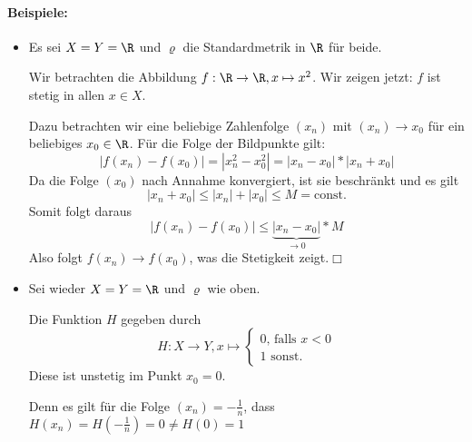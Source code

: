 \paragraph{Beispiele:}
\begin{itemize}
	\item Es sei $X=Y=\R$ und $\varrho$ die Standardmetrik in $\R$ für beide.

	Wir betrachten die Abbildung $f:\R\rightarrow\R,x\mapsto x^2$. Wir zeigen jetzt: $f$ ist stetig in allen $x\in X$.

	Dazu betrachten wir eine beliebige Zahlenfolge $(x_n)$ mit $(x_n)\to x_0$ für ein beliebiges $x_0\in\R$.
	Für die Folge der Bildpunkte gilt:
	\begin{equation*}
		|f(x_n)-f(x_0)|=|x_n^2-x_0^2|=|x_n-x_0|*|x_n+x_0|
	\end{equation*}
	Da die Folge $(x_0)$ nach Annahme konvergiert, ist sie beschränkt und es gilt
	\begin{equation*}
		|x_n+x_0|\leq|x_n|+|x_0|\leq M=\mathrm{const.}
	\end{equation*}
	Somit folgt daraus
	\begin{equation*}
		|f(x_n)-f(x_0)|\leq\underbrace{|x_n-x_0|}_{\to 0}*M
	\end{equation*}
	Also folgt $f(x_n)\to f(x_0)$, was die Stetigkeit zeigt.\hfill$\Box$

	\item Sei wieder $X=Y=\R$ und $\varrho$ wie oben.

	Die Funktion $H$ gegeben durch
	\begin{equation*}
		H:X\rightarrow Y, x\mapsto
		\begin{cases}
			0 \text{, falls }x<0\\
			1 \text{ sonst.}
		\end{cases}
	\end{equation*}
	Diese ist unstetig im Punkt $x_0=0$.

	Denn es gilt für die Folge $(x_n)=-\frac 1n$, dass $H(x_n)=H(-\frac 1n)=0\neq H(0)=1$
\end{itemize}

